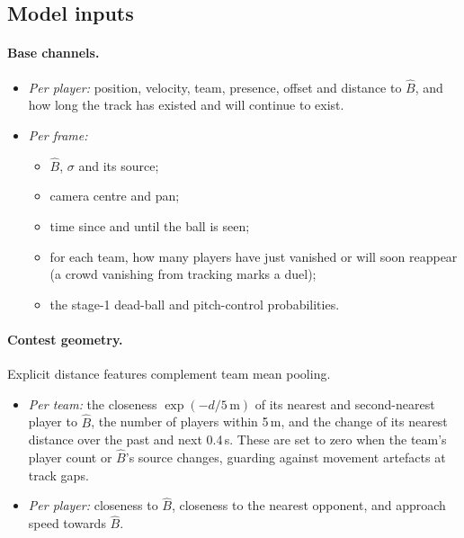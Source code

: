 \documentclass[10pt,a4paper,twocolumn]{article}
\begin{document}
\subsection{Model inputs}\label{sec:inputs}

\paragraph{Base channels.}
\begin{itemize}
  \item \emph{Per player:} position, velocity, team, presence, offset and distance to $\hat B$, and
        how long the track has existed and will continue to exist.
  \item \emph{Per frame:}
  \begin{itemize}
    \item $\hat B$, $\sigma$ and its source;
    \item camera centre and pan;
    \item time since and until the ball is seen;
    \item for each team, how many players have just vanished or will soon reappear (a crowd
          vanishing from tracking marks a duel);
    \item the stage-1 dead-ball and pitch-control probabilities.
  \end{itemize}
\end{itemize}

\paragraph{Contest geometry.} Explicit distance features complement team mean pooling.
\begin{itemize}
  \item \emph{Per team:} the closeness $\exp(-d/5\,\mathrm m)$ of its nearest and second-nearest
        player to $\hat B$, the number of players within 5\,m, and the change of its nearest
        distance over the past and next 0.4\,s. These are set to zero when the team's player count
        or $\hat B$'s source changes, guarding against movement artefacts at track gaps.
  \item \emph{Per player:} closeness to $\hat B$, closeness to the nearest opponent, and approach
        speed towards $\hat B$.
\end{itemize}
\end{document}
